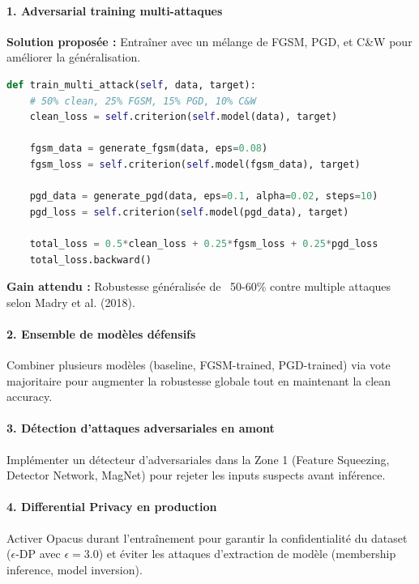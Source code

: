 \paragraph{1. Adversarial training multi-attaques}

\textbf{Solution proposée :} Entraîner avec un mélange de FGSM, PGD, et C\&W pour améliorer la généralisation.

\begin{lstlisting}[language=Python, caption=Adversarial training multi-attaques]
def train_multi_attack(self, data, target):
    # 50% clean, 25% FGSM, 15% PGD, 10% C&W
    clean_loss = self.criterion(self.model(data), target)

    fgsm_data = generate_fgsm(data, eps=0.08)
    fgsm_loss = self.criterion(self.model(fgsm_data), target)

    pgd_data = generate_pgd(data, eps=0.1, alpha=0.02, steps=10)
    pgd_loss = self.criterion(self.model(pgd_data), target)

    total_loss = 0.5*clean_loss + 0.25*fgsm_loss + 0.25*pgd_loss
    total_loss.backward()
\end{lstlisting}

\textbf{Gain attendu :} Robustesse généralisée de ~50-60\% contre multiple attaques selon Madry et al. (2018).

\paragraph{2. Ensemble de modèles défensifs}

Combiner plusieurs modèles (baseline, FGSM-trained, PGD-trained) via vote majoritaire pour augmenter la robustesse globale tout en maintenant la clean accuracy.

\paragraph{3. Détection d'attaques adversariales en amont}

Implémenter un détecteur d'adversariales dans la Zone 1 (Feature Squeezing, Detector Network, MagNet) pour rejeter les inputs suspects avant inférence.

\paragraph{4. Differential Privacy en production}

Activer Opacus durant l'entraînement pour garantir la confidentialité du dataset ($\epsilon$-DP avec $\epsilon = 3.0$) et éviter les attaques d'extraction de modèle (membership inference, model inversion).

